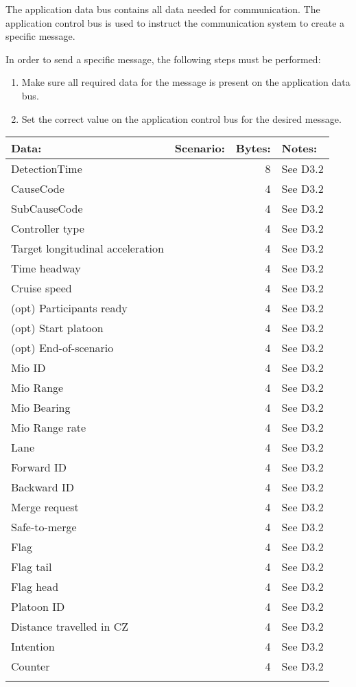 \documentclass[11pt]{article}
\begin{document}
The application data bus contains all data needed for communication.
The application control bus is used to instruct the communication
system to create a specific message.

In order to send a specific message, the following steps
must be performed:
\begin{enumerate}
\item Make sure all required data for the message is present on the
application data bus.
\item Set the correct value on the application control bus for the
desired message.
\end{enumerate}

\begin{center}
\begin{tabular}{llrl}
Data: & Scenario: & Bytes: & Notes:\\
\hline
DetectionTime &  & 8 & See D3.2\\
CauseCode &  & 4 & See D3.2\\
SubCauseCode &  & 4 & See D3.2\\
Controller type &  & 4 & See D3.2\\
Target longitudinal acceleration &  & 4 & See D3.2\\
Time headway &  & 4 & See D3.2\\
Cruise speed &  & 4 & See D3.2\\
(opt) Participants ready &  & 4 & See D3.2\\
(opt) Start platoon &  & 4 & See D3.2\\
(opt) End-of-scenario &  & 4 & See D3.2\\
Mio ID &  & 4 & See D3.2\\
Mio Range &  & 4 & See D3.2\\
Mio Bearing &  & 4 & See D3.2\\
Mio Range rate &  & 4 & See D3.2\\
Lane &  & 4 & See D3.2\\
Forward ID &  & 4 & See D3.2\\
Backward ID &  & 4 & See D3.2\\
Merge request &  & 4 & See D3.2\\
Safe-to-merge &  & 4 & See D3.2\\
Flag &  & 4 & See D3.2\\
Flag tail &  & 4 & See D3.2\\
Flag head &  & 4 & See D3.2\\
Platoon ID &  & 4 & See D3.2\\
Distance travelled in CZ &  & 4 & See D3.2\\
Intention &  & 4 & See D3.2\\
Counter &  & 4 & See D3.2\\
 &  &  & \\
\end{tabular}
\end{center}
\end{document}
